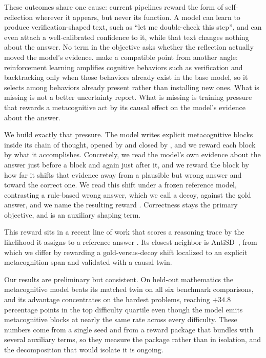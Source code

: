 These outcomes share one cause: current pipelines reward the form of
self-reflection wherever it appears, but never its function. A model can learn to
produce verification-shaped text, such as ``let me double-check this step'', and
can even attach a well-calibrated confidence to it, while that text changes
nothing about the answer. No term in the objective asks whether the reflection
actually moved the model's evidence. \citet{gandhi2025cognitive} make a
compatible point from another angle: reinforcement learning amplifies cognitive
behaviors such as verification and backtracking only when those behaviors
already exist in the base model, so it selects among behaviors already present
rather than installing new ones. What is missing is not a better uncertainty
report. What is missing is training pressure that rewards a metacognitive act by
its causal effect on the model's evidence about the answer.

We build exactly that pressure. The model writes explicit metacognitive blocks
inside its chain of thought, opened by \metaopen{} and closed by \metaclose{},
and we reward each block by what it accomplishes. Concretely, we read the
model's own evidence about the answer just before a block and again just after
it, and we reward the block by how far it shifts that evidence away from a
plausible but wrong answer and toward the correct one. We read this shift under a
frozen reference model, contrasting a rule-based wrong answer, which we call a
decoy, against the gold answer, and we name the resulting reward \pmishift{}.
Correctness stays the primary objective, and \pmishift{} is an auxiliary shaping
term.

This reward sits in a recent line of work that scores a reasoning trace by the
likelihood it assigns to a reference answer
\citep{yu2025rlpr,zhang2025crm,mulgund2026rlsd}. Its closest neighbor is
AntiSD~\citep{shen2026antisd}, from which we differ by rewarding a
gold-versus-decoy shift localized to an explicit metacognition span and validated
with a causal twin.

Our results are preliminary but consistent. On held-out mathematics the
metacognitive model beats its matched twin on all six benchmark comparisons, and
its advantage concentrates on the hardest problems, reaching $+34.8$ percentage
points in the top difficulty quartile even though the model emits metacognitive
blocks at nearly the same rate across every difficulty. These numbers come from a
single seed and from a reward package that bundles \pmishift{} with several
auxiliary terms, so they measure the package rather than \pmishift{} in
isolation, and the decomposition that would isolate it is ongoing.

